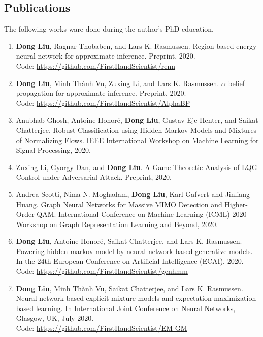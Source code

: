 \subsection{Publications}
The following works ware done during the author's PhD education.
\begin{enumerate}
\item \label{pub-renn} \textbf{Dong Liu}, Ragnar Thobaben, and Lars K. Rasmussen. Region-based energy neural network for approximate inference. Preprint, 2020. \\
  Code: \href{https://github.com/FirstHandScientist/renn}{https://github.com/FirstHandScientist/renn}
\item \label{pub-alphabp-convergence}\textbf{Dong Liu}, Minh Th\`{a}nh Vu, Zuxing Li, and Lars K. Rasmussen. $\alpha$ belief propagation for approximate inference. Preprint, 2020.\\
  Code: \href{https://github.com/FirstHandScientist/AlphaBP}{https://github.com/FirstHandScientist/AlphaBP}

\item Anubhab Ghosh, Antoine Honor{\'e}, \textbf{Dong Liu}, Gustav Eje Henter, and Saikat Chatterjee. Robust Classification using Hidden Markov Models and Mixtures of Normalizing Flows. IEEE International Workshop on Machine Learning for Signal
Processing, 2020.

\item Zuxing Li, Gyorgy Dan, and \textbf{Dong Liu}. A Game Theoretic Analysis of LQG Control under Adversarial Attack. Preprint, 2020.

\item Andrea Scotti, Nima N. Moghadam, \textbf{Dong Liu}, Karl Gafvert and Jinliang Huang. Graph Neural Networks for Massive MIMO Detection and Higher-Order QAM. International Conference on Machine Learning (ICML) 2020 Workshop on Graph Representation Learning and Beyond, 2020.


\item \label{pub-hmm-flow} \textbf{Dong Liu}, Antoine Honor{\'e}, Saikat Chatterjee, and Lars K. Rasmussen. Powering hidden
  markov model by neural network based generative models. In the 24th European Conference on Artificial Intelligence (ECAI), 2020.\\
  Code: \href{https://github.com/FirstHandScientist/genhmm}{https://github.com/FirstHandScientist/genhmm}

\item \label{pub-em-flow} \textbf{Dong Liu}, Minh Th\`{a}nh Vu, Saikat Chatterjee, and Lars K. Rasmussen. Neural network based explicit mixture models and expectation-maximization based learning. In International Joint Conference on Neural Networks, Glasgow, UK, July 2020. \\
  Code: \href{https://github.com/FirstHandScientist/EM-GM}{https://github.com/FirstHandScientist/EM-GM}


\end{enumerate}
